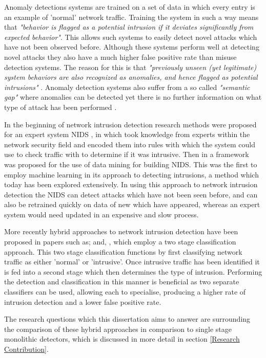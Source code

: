 	Anomaly detections systems are trained on a set of data in which every entry is an example of 'normal' network traffic. Training the system in such a way means that \textit{"behavior is flagged as a potential intrusion if it deviates significantly from expected behavior"}\cite{Javitz1994TheNS}. This allows such systems to easily detect novel attacks which have not been observed before. Although these systems perform well at detecting novel attacks they also have a much higher false positive rate than misuse detection systems. The reason for this is that \textit{"previously  unseen  (yet  legitimate)  system  behaviors are also recognized as anomalies, and hence flagged as potential intrusions"} \cite{lazarevic2003comparative}. Anomaly detection systems also suffer from a so called \textit{"semantic gap"} where anomalies can be detected yet there is no further information on what type of attack has been performed \cite{sommer2010outside}.
	
	In the beginning of network intrusion detection research methods were proposed for an expert system NIDS \cite{Ilgun1995rule}, in which took knowledge from experts within the network security field and encoded them into rules with which the system could use to check traffic with to determine if it was intrusive. Then in \cite{Lee1999framework} a framework was proposed for the use of data mining for building NIDS. This was the first to employ machine learning in its approach to detecting intrusions, a method which today has been explored extensively. In using this approach to network intrusion detection the NIDS can detect attacks which have not been seen before, and can also be retrained quickly on data of new which have appeared, whereas an expert system would need updated in an expensive and slow process.
	
	More recently hybrid approaches to network intrusion detection have been proposed in papers such as; \cite{powers2008hybrid} and, \cite{panda2012hybrid}, which employ a two stage classification approach. This two stage classification functions by first classifying network traffic as either 'normal' or 'intrusive'. Once intrusive traffic has been identified it is fed into a second stage which then determines the type of intrusion. Performing the detection and classification in this manner is beneficial as two separate classifiers can be used, allowing each to specialise, producing a higher rate of intrusion detection and a lower false positive rate.
	
	The research questions which this dissertation aims to answer are surrounding the comparison of these hybrid approaches in comparison to single stage monolithic detectors, which is discussed in more detail in section \ref{Research Contribution}. 
	
